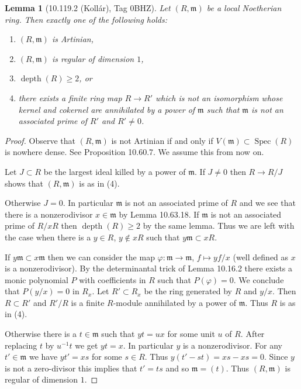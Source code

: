 \documentclass[UTF8,11pt]{ctexart}
\newtheorem*{lemma}{Lemma}
\newcommand{\Spec}{\operatorname{Spec}}
\begin{document}
\begin{lemma}[10.119.2 (Koll\'ar), Tag 0BHZ]
Let $(R,\mathfrak m)$ be a local Noetherian ring. Then exactly one of the following holds:
\begin{enumerate}
\item $(R,\mathfrak m)$ is Artinian,
\item $(R,\mathfrak m)$ is regular of dimension $1$,
\item $\operatorname{depth}(R)\geq2$, or
\item there exists a finite ring map $R\to R'$ which is not an isomorphism whose kernel and cokernel are annihilated by a power of $\mathfrak m$ such that $\mathfrak m$ is not an associated prime of $R'$ and $R'\ne0$.
\end{enumerate}
\end{lemma}
\begin{proof}
Observe that $(R,\mathfrak m)$ is not Artinian if and only if $V(\mathfrak m)\subset\Spec(R)$ is nowhere dense. See Proposition 10.60.7. We assume this from now on.

Let $J\subset R$ be the largest ideal killed by a power of $\mathfrak m$. If $J\ne0$ then $R\to R/J$ shows that $(R,\mathfrak m)$ is as in (4).

Otherwise $J=0$. In particular $\mathfrak m$ is not an associated prime of $R$ and we see that there is a nonzerodivisor $x\in\mathfrak m$ by Lemma 10.63.18. If $\mathfrak m$ is not an associated prime of $R/xR$ then $\operatorname{depth}(R)\geq2$ by the same lemma. Thus we are left with the case when there is a $y\in R$, $y\notin xR$ such that $y\mathfrak m\subset xR$.

If $y\mathfrak m\subset x\mathfrak m$ then we can consider the map $\varphi:\mathfrak m\to\mathfrak m$, $f\mapsto yf/x$ (well defined as $x$ is a nonzerodivisor). By the determinantal trick of Lemma 10.16.2 there exists a monic polynomial $P$ with coefficients in $R$ such that $P(\varphi)=0$. We conclude that $P(y/x)=0$ in $R_x$. Let $R'\subset R_x$ be the ring generated by $R$ and $y/x$. Then $R\subset R'$ and $R'/R$ is a finite $R$-module annihilated by a power of $\mathfrak m$. Thus $R$ is as in (4).

Otherwise there is a $t\in\mathfrak m$ such that $yt=ux$ for some unit $u$ of $R$. After replacing $t$ by $u^{-1}t$ we get $yt=x$. In particular $y$ is a nonzerodivisor. For any $t'\in\mathfrak m$ we have $yt'=xs$ for some $s\in R$. Thus $y(t'-st)=xs-xs=0$. Since $y$ is not a zero-divisor this implies that $t'=ts$ and so $\mathfrak m=(t)$. Thus $(R,\mathfrak m)$ is regular of dimension $1$.


\end{proof}
\end{document}
